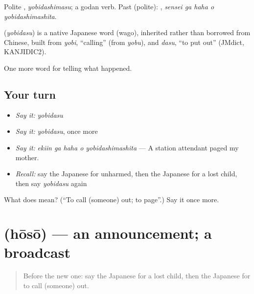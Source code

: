 Polite \textbf{}, \emph{yobidashimasu}; a godan verb. Past (polite): \textbf{  }, \emph{sensei ga haha o yobidashimashita}.

\begin{cousinweb}
\textbf{} (\emph{yobidasu}) is a native Japanese word (wago), inherited rather than borrowed from Chinese, built from \emph{yobi}, \textquotedblleft{}calling\textquotedblright{} (from \emph{yobu}), and \emph{dasu}, \textquotedblleft{}to put out\textquotedblright{} (JMdict, KANJIDIC2).
\end{cousinweb}

\begin{grammarlens}[title={What you've built}]
One more word for telling what happened.
\end{grammarlens}

\subsection*{Your turn}
\begin{itemize}
\raggedright
  \item \emph{Say it:} \emph{yobidasu}
  \item \emph{Say it:} \emph{yobidasu}, once more
  \item \emph{Say it:} \emph{ekiin ga haha o yobidashimashita} — A station attendant paged my mother.
  \item \emph{Recall:} say the Japanese for unharmed, then the Japanese for a lost child, then say \emph{yobidasu} again
\end{itemize}

\begin{tcolorbox}[breakable,colback=teal!4,colframe=teal!35!black,title={Before you move on}]
What does  mean? (\textquotedblleft{}To call (someone) out; to page\textquotedblright{}.) Say it once more.
\end{tcolorbox}
\section[\texorpdfstring{\ja{ほうそう} (hōsō)}{ほうそう (hōsō)}]{ (hōsō) — an announcement; a broadcast}

\label{lesson:JA-C267-housou}



\begin{quote}
Before the new one: say the Japanese for a lost child, then the Japanese for to call (someone) out.
\end{quote}

